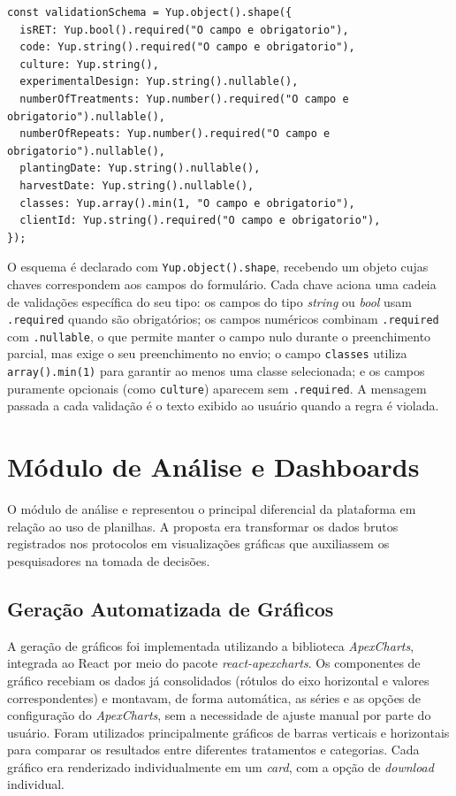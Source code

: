 \begin{lstlisting}[caption={Trecho do esquema de validação (\textit{Yup}) da aba de Informações do protocolo.}, label={cod:yup}]
const validationSchema = Yup.object().shape({
  isRET: Yup.bool().required("O campo e obrigatorio"),
  code: Yup.string().required("O campo e obrigatorio"),
  culture: Yup.string(),
  experimentalDesign: Yup.string().nullable(),
  numberOfTreatments: Yup.number().required("O campo e obrigatorio").nullable(),
  numberOfRepeats: Yup.number().required("O campo e obrigatorio").nullable(),
  plantingDate: Yup.string().nullable(),
  harvestDate: Yup.string().nullable(),
  classes: Yup.array().min(1, "O campo e obrigatorio"),
  clientId: Yup.string().required("O campo e obrigatorio"),
});
\end{lstlisting}

O esquema é declarado com \texttt{Yup.object().shape}, recebendo um objeto cujas chaves correspondem aos campos do formulário. Cada chave aciona uma cadeia de validações específica do seu tipo: os campos do tipo \textit{string} ou \textit{bool} usam \texttt{.required} quando são obrigatórios; os campos numéricos combinam \texttt{.required} com \texttt{.nullable}, o que permite manter o campo nulo durante o preenchimento parcial, mas exige o seu preenchimento no envio; o campo \texttt{classes} utiliza \texttt{array().min(1)} para garantir ao menos uma classe selecionada; e os campos puramente opcionais (como \texttt{culture}) aparecem sem \texttt{.required}. A mensagem passada a cada validação é o texto exibido ao usuário quando a regra é violada.

\section{Módulo de Análise e Dashboards}

O módulo de análise e  representou o principal diferencial da plataforma em relação ao uso de planilhas. A proposta era transformar os dados brutos registrados nos protocolos em visualizações gráficas que auxiliassem os pesquisadores na tomada de decisões.

\subsection{Geração Automatizada de Gráficos}

A geração de gráficos foi implementada utilizando a biblioteca \textit{ApexCharts}, integrada ao React por meio do pacote \textit{react-apexcharts}. Os componentes de gráfico recebiam os dados já consolidados (rótulos do eixo horizontal e valores correspondentes) e montavam, de forma automática, as séries e as opções de configuração do \textit{ApexCharts}, sem a necessidade de ajuste manual por parte do usuário. Foram utilizados principalmente gráficos de barras verticais e horizontais para comparar os resultados entre diferentes tratamentos e categorias. Cada gráfico era renderizado individualmente em um \textit{card}, com a opção de \textit{download} individual.

